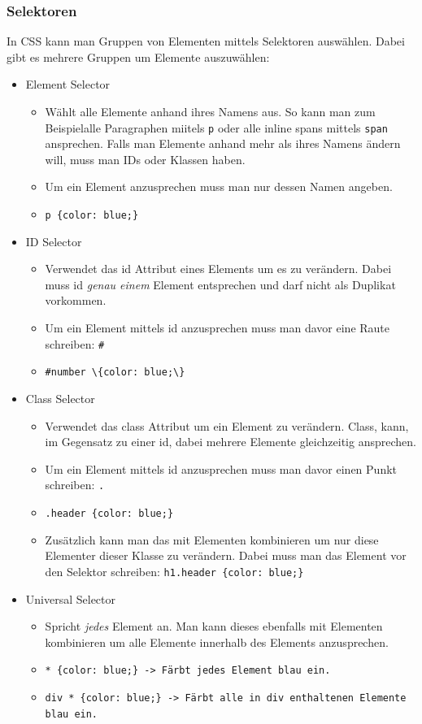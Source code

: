 \documentclass{article}
\begin{document}
	\subsubsection{Selektoren}
	In CSS kann man Gruppen von Elementen mittels Selektoren auswählen. Dabei gibt es mehrere Gruppen um Elemente auszuwählen:
	\begin{itemize}
		\item{Element Selector}
		\begin{itemize}
			\item{Wählt alle Elemente anhand ihres Namens aus. So kann man zum Beispielalle Paragraphen miitels \texttt{p} oder alle inline spans mittels \texttt{span} ansprechen. Falls man Elemente anhand mehr als ihres Namens ändern will, muss man IDs oder Klassen haben.}
			\item{Um ein Element anzusprechen muss man nur dessen Namen angeben.}
			\item{\texttt{p \{color: blue;\}}}
		\end{itemize}
		\item{ID Selector}
		\begin{itemize}
			\item{Verwendet das id Attribut eines Elements um es zu verändern. Dabei muss id \textit{genau einem} Element entsprechen und darf nicht als Duplikat vorkommen.}
			\item{Um ein Element mittels id anzusprechen muss man davor eine Raute schreiben: \verb|#|}
			\item{\verb|#number \{color: blue;\}|}
		\end{itemize}
		\item{Class Selector}
		\begin{itemize}
			\item{Verwendet das class Attribut um ein Element zu verändern. Class, kann, im Gegensatz zu einer id, dabei mehrere Elemente gleichzeitig ansprechen.}
			\item{Um ein Element mittels id anzusprechen muss man davor einen Punkt schreiben: \texttt{.}}
			\item{\texttt{.header \{color: blue;\}}}
			\item{Zusätzlich kann man das mit Elementen kombinieren um nur diese Elementer dieser Klasse zu verändern. Dabei muss man das Element vor den Selektor schreiben: \verb|h1.header {color: blue;}|}
		\end{itemize}
		\item{Universal Selector}
		\begin{itemize}
			\item{Spricht \textit{jedes} Element an. Man kann dieses ebenfalls mit Elementen kombinieren um alle Elemente innerhalb des Elements anzusprechen.}
			\item{\texttt{* \{color: blue;\} -> Färbt jedes Element blau ein.}}
			\item{\texttt{div * \{color: blue;\} -> Färbt alle in div enthaltenen Elemente blau ein.}}
		\end{itemize}
	\end{itemize}
\end{document}
